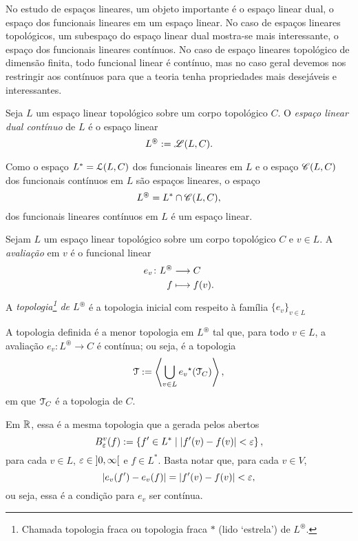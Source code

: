 No estudo de espaços lineares, um objeto importante é o espaço linear dual, o espaço dos funcionais lineares em um espaço linear. No caso de espaços lineares topológicos, um subespaço do espaço linear dual mostra-se mais interessante, o espaço dos funcionais lineares contínuos. No caso de espaço lineares topológico de dimensão finita, todo funcional linear é contínuo, mas no caso geral devemos nos restringir aos contínuos para que a teoria tenha propriedades mais desejáveis e interessantes.

\begin{definition}
Seja $L$ um espaço linear topológico sobre um corpo topológico $C$. O \emph{espaço linear dual contínuo} de $L$ é o espaço linear
	\begin{equation*}
	L^\circledast := \mathscr{L}(L,C).
	\end{equation*}
\end{definition}

Como o espaço $L^* = \mathcal{L}(L,C)$ dos funcionais lineares em $L$ e o espaço $\mathscr{C}(L,C)$ dos funcionais contínuos em $L$ são espaços lineares, o espaço
	\begin{equation*}
	L^\circledast = L^* \cap \mathscr{C}(L,C),
	\end{equation*}
dos funcionais lineares contínuos em $L$ é um espaço linear.

\begin{definition}
Sejam $L$ um espaço linear topológico sobre um corpo topológico $C$ e $v \in L$. A \emph{avaliação} em $v$ é o funcional linear
	\begin{align*}
	{e_v}\colon {L^\circledast} &\longrightarrow {C} \\{f} &\longmapsto f(v).
	\end{align*}
A \emph{topologia\footnote{Chamada topologia fraca ou topologia fraca $*$ (lido `estrela') de $L^\circledast$.} de $L^\circledast$} é a topologia inicial com respeito à família $\{e_v\}_{v \in L}$
\end{definition}

A topologia definida é a menor topologia em $L^\circledast$ tal que, para todo $v \in L$, a avaliação $e_v\colon L^\circledast \to C$ é contínua; ou seja, é a topologia
	\begin{equation*}
	\mathcal{T} := \left\langle \bigcup_{v \in L} {e_v}^\star(\mathcal{T}_C) \right\rangle,
	\end{equation*}
em que $\mathcal{T}_C$ é a topologia de $C$.

Em $\mathbb{R}$, essa é a mesma topologia que a gerada pelos abertos
	\begin{equation*}
	B^v_\varepsilon(f) := \left\{{f' \in L^*}\;\middle\vert\;{\left\vert{f'(v)-f(v)}\right\vert < \varepsilon}\right\},
	\end{equation*}
para cada $v \in L$, $\varepsilon \in \left]{0},{\infty}\right[$ e $f \in L^*$. Basta notar que, para cada $v \in V$,
	\begin{equation*}
	\left\vert{e_v(f') - e_v(f)}\right\vert = \left\vert{f'(v)-f(v)}\right\vert < \varepsilon,
	\end{equation*}
ou seja, essa é a condição para $e_v$ ser contínua.



